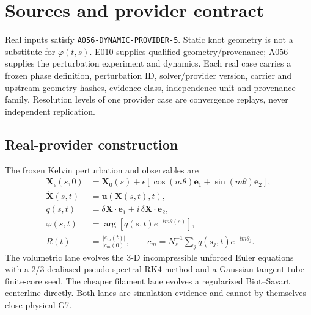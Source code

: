 \documentclass[11pt,a4paper]{article}
\newcommand{\code}[1]{\texttt{#1}}
\begin{document}

\section{Sources and provider contract}
Real inputs satisfy \code{A056-DYNAMIC-PROVIDER-5}. Static knot geometry is not a substitute for $\varphi(t,s)$. E010 supplies qualified geometry/provenance; A056 supplies the perturbation experiment and dynamics. Each real case carries a frozen phase definition, perturbation ID, solver/provider version, carrier and upstream geometry hashes, evidence class, independence unit and provenance family. Resolution levels of one provider case are convergence replays, never independent replication.

\subsection{Real-provider construction}
The frozen Kelvin perturbation and observables are
\begin{align}
\mathbf X_\epsilon(s,0)&=\mathbf X_0(s)+\epsilon[\cos(m\theta)\mathbf e_1+\sin(m\theta)\mathbf e_2],\\
\dot{\mathbf X}(s,t)&=\mathbf u(\mathbf X(s,t),t),\\
q(s,t)&=\delta\mathbf X\cdot\mathbf e_1+i\,\delta\mathbf X\cdot\mathbf e_2,\\
\varphi(s,t)&=\arg[q(s,t)e^{-im\theta(s)}],\\
R(t)&=\frac{|c_m(t)|}{|c_m(0)|},\qquad c_m=N_s^{-1}\sum_jq(s_j,t)e^{-im\theta_j}.
\end{align}
The volumetric lane evolves the 3-D incompressible unforced Euler equations with a 2/3-dealiased pseudo-spectral RK4 method and a Gaussian tangent-tube finite-core seed. The cheaper filament lane evolves a regularized Biot--Savart centerline directly. Both lanes are simulation evidence and cannot by themselves close physical G7.

\end{document}
